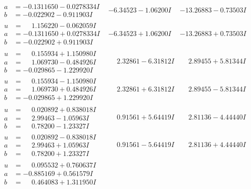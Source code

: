 \documentclass[1p]{elsarticle_modified}
\theoremstyle{definition}
\begin{document}
$$\begin{array}{c|c|c}
\begin{aligned}
a &= -0.1311650 - 0.0278334 I \\
b &= -0.022902 - 0.911903 I\end{aligned}
 & -6.34523 - 1.06200 I & -13.26883 - 0.73503 I \\ \hline\begin{aligned}
u &= \phantom{-}1.156220 - 0.062059 I \\
a &= -0.1311650 + 0.0278334 I \\
b &= -0.022902 + 0.911903 I\end{aligned}
 & -6.34523 + 1.06200 I & -13.26883 + 0.73503 I \\ \hline\begin{aligned}
u &= \phantom{-}0.155934 + 1.150980 I \\
a &= \phantom{-}1.069730 - 0.484926 I \\
b &= -0.029865 - 1.229920 I\end{aligned}
 & \phantom{-}2.32861 - 6.31812 I & \phantom{-}2.89455 + 5.81344 I \\ \hline\begin{aligned}
u &= \phantom{-}0.155934 - 1.150980 I \\
a &= \phantom{-}1.069730 + 0.484926 I \\
b &= -0.029865 + 1.229920 I\end{aligned}
 & \phantom{-}2.32861 + 6.31812 I & \phantom{-}2.89455 - 5.81344 I \\ \hline\begin{aligned}
u &= \phantom{-}0.020892 + 0.838018 I \\
a &= \phantom{-}2.99463 - 1.05963 I \\
b &= \phantom{-}0.78200 - 1.23327 I\end{aligned}
 & \phantom{-}0.91561 + 5.64419 I & \phantom{-}2.81136 - 4.44440 I \\ \hline\begin{aligned}
u &= \phantom{-}0.020892 - 0.838018 I \\
a &= \phantom{-}2.99463 + 1.05963 I \\
b &= \phantom{-}0.78200 + 1.23327 I\end{aligned}
 & \phantom{-}0.91561 - 5.64419 I & \phantom{-}2.81136 + 4.44440 I \\ \hline\begin{aligned}
u &= \phantom{-}0.095532 + 0.760637 I \\
a &= -0.885169 + 0.561579 I \\
b &= \phantom{-}0.464083 + 1.311950 I\end{aligned}

\end{array}$$
\end{document}
